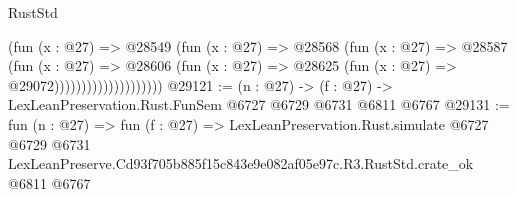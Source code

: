 \begin{lexlean}{RustStd}
\begin{coremodule}
                                (fun (x : @27) =>
                                @28549
                                  (fun (x : @27) =>
                                  @28568
                                    (fun (x : @27) =>
                                    @28587
                                      (fun (x : @27) =>
                                      @28606
                                        (fun (x : @27) =>
                                        @28625 (fun (x : @27) => @29072))))))))))))))))))))
@29121 := (n : @27) -> (f : @27) -> LexLeanPreservation.Rust.FunSem @6727 @6729 @6731 @6811 @6767
@29131 := fun (n : @27) =>
  fun (f : @27) =>
  LexLeanPreservation.Rust.simulate
    @6727
    @6729
    @6731
    LexLeanPreserve.Cd93f705b885f15c843e9e082af05e97c.R3.RustStd.crate_ok
    @6811
    @6767
\end{coremodule}
\end{lexlean}
